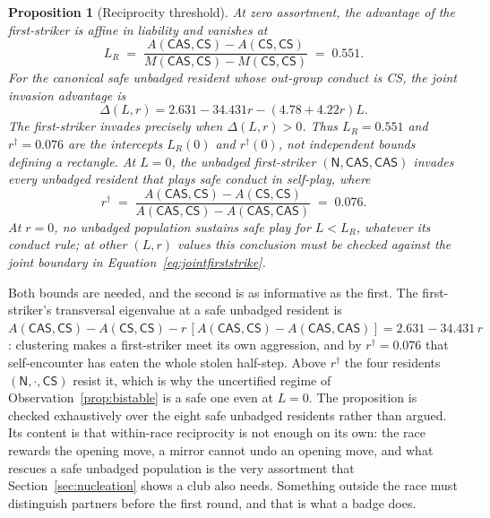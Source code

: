 \documentclass[11pt,a4paper]{article}
\newtheorem{proposition}[theorem]{Proposition}
\theoremstyle{definition}
\newcommand{\CS}{\textsf{CS}}
\newcommand{\CAS}{\textsf{CAS}}
\begin{document}
\begin{proposition}[Reciprocity threshold]
\label{prop:reciprocity}
At zero assortment, the advantage of the first-striker is affine in liability
and vanishes at
\begin{equation}
\label{eq:LR}
L_R \;=\; \frac{A(\CAS, \CS) - A(\CS, \CS)}{M(\CAS, \CS) - M(\CS, \CS)}
      \;=\; 0.551 .
\end{equation}
For the canonical safe unbadged resident whose out-group conduct is \CS{}, the
joint invasion advantage is
\begin{equation}
\label{eq:jointfirststrike}
\Delta(L,r) = 2.631 - 34.431r - (4.78 + 4.22r)L .
\end{equation}
The first-striker invades precisely when $\Delta(L,r)>0$. Thus
$L_R=0.551$ and $r^{\dagger}=0.076$ are the intercepts $L_R(0)$ and
$r^{\dagger}(0)$, not independent bounds defining a rectangle. At $L=0$,
the unbadged first-striker $(\mathsf{N}, \CAS, \CAS)$ invades every unbadged
resident that plays safe conduct in self-play, where
\begin{equation}
\label{eq:rdagger}
r^{\dagger} \;=\; \frac{A(\CAS, \CS) - A(\CS, \CS)}{A(\CAS, \CS) - A(\CAS, \CAS)}
      \;=\; 0.076 .
\end{equation}
At $r=0$, no unbadged population sustains safe play for $L<L_R$, whatever its
conduct rule; at other $(L,r)$ values this conclusion must be checked against
the joint boundary in Equation~\eqref{eq:jointfirststrike}.
\end{proposition}

Both bounds are needed, and the second is as informative as the first. The
first-striker's transversal eigenvalue at a safe unbadged resident is
$A(\CAS, \CS) - A(\CS, \CS) - r\,[A(\CAS, \CS) - A(\CAS, \CAS)]
 = 2.631 - 34.431\,r$: clustering makes a first-striker meet its own aggression,
and by $r^{\dagger} = 0.076$ that self-encounter has eaten the whole stolen
half-step. Above $r^{\dagger}$ the four residents $(\mathsf{N}, \cdot, \CS)$
resist it, which is why the uncertified regime of
Observation~\ref{prop:bistable} is a safe one even at $L = 0$. The proposition
is checked exhaustively over the eight safe unbadged residents rather than
argued. Its content is that within-race reciprocity is not enough on its own:
the race rewards the opening move, a mirror cannot undo an opening move, and
what rescues a safe unbadged population is the very assortment that
Section~\ref{sec:nucleation} shows a club also needs. Something outside the
race must distinguish partners before the first round, and that is what a badge
does.
\end{document}
